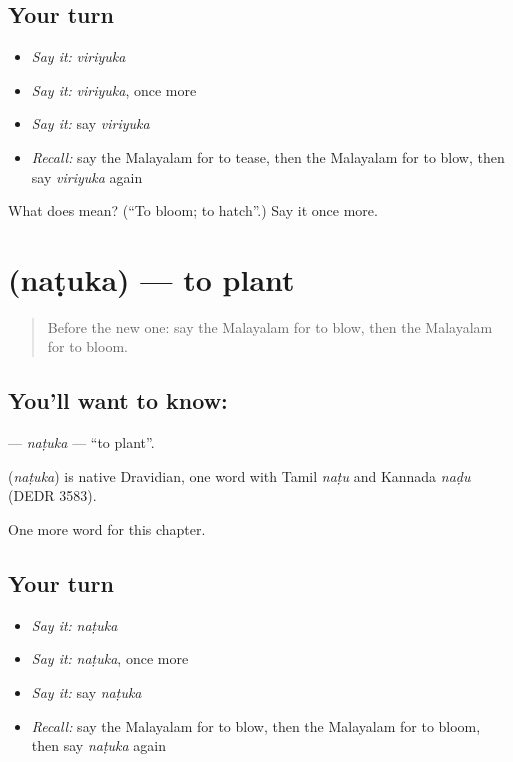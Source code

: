 \subsection*{Your turn}
\begin{itemize}
\raggedright
  \item \emph{Say it:} \emph{viriyuka}
  \item \emph{Say it:} \emph{viriyuka}, once more
  \item \emph{Say it:} say \emph{viriyuka}
  \item \emph{Recall:} say the Malayalam for to tease, then the Malayalam for to blow, then say \emph{viriyuka} again
\end{itemize}

\begin{tcolorbox}[breakable,colback=teal!4,colframe=teal!35!black,title={Before you move on}]
What does  mean? (\textquotedblleft{}To bloom; to hatch\textquotedblright{}.) Say it once more.
\end{tcolorbox}
\section[\texorpdfstring{\ml{നടുക} (naṭuka)}{നടുക (naṭuka)}]{ (naṭuka) — to plant}

\label{lesson:ML-C187-natuka}



\begin{quote}
Before the new one: say the Malayalam for to blow, then the Malayalam for to bloom.
\end{quote}

\subsection*{You'll want to know: }
\textbf{} — \emph{naṭuka} — \textquotedblleft{}to plant\textquotedblright{}.

\begin{cousinweb}
\textbf{} (\emph{naṭuka}) is native Dravidian, one word with Tamil \emph{naṭu} and Kannada \emph{naḍu} (DEDR 3583).
\end{cousinweb}

\begin{grammarlens}[title={What you've built}]
One more word for this chapter.
\end{grammarlens}

\subsection*{Your turn}
\begin{itemize}
\raggedright
  \item \emph{Say it:} \emph{naṭuka}
  \item \emph{Say it:} \emph{naṭuka}, once more
  \item \emph{Say it:} say \emph{naṭuka}
  \item \emph{Recall:} say the Malayalam for to blow, then the Malayalam for to bloom, then say \emph{naṭuka} again
\end{itemize}

